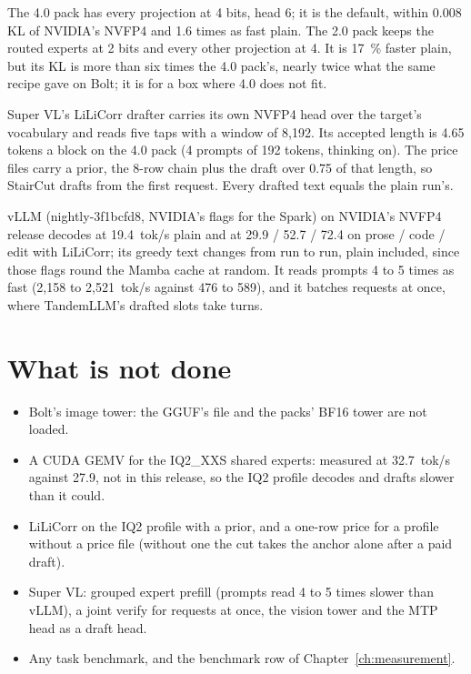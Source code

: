 The 4.0 pack has every projection at 4 bits, head 6; it is the default, within 0.008 KL of NVIDIA's NVFP4 and 1.6 times as fast plain. The 2.0 pack keeps the routed experts at 2 bits and every other projection at 4. It is 17~\% faster plain, but its KL is more than six times the 4.0 pack's, nearly twice what the same recipe gave on Bolt; it is for a box where 4.0 does not fit.

Super VL's LiLiCorr drafter carries its own NVFP4 head over the target's vocabulary and reads five taps with a window of 8,192. Its accepted length is 4.65 tokens a block on the 4.0 pack (4 prompts of 192 tokens, thinking on). The price files carry a  prior, the 8-row chain plus the draft over 0.75 of that length, so StairCut drafts from the first request. Every drafted text equals the plain run's.

vLLM (nightly-3f1bcfd8, NVIDIA's flags for the Spark) on NVIDIA's NVFP4 release decodes at 19.4~tok/s plain and at 29.9 / 52.7 / 72.4 on prose / code / edit with LiLiCorr; its greedy text changes from run to run, plain included, since those flags round the Mamba cache at random. It reads prompts 4 to 5 times as fast (2,158 to 2,521~tok/s against 476 to 589), and it batches requests at once, where TandemLLM's drafted slots take turns.

\section{What is not done}

\begin{itemize}
\item Bolt's image tower: the GGUF's  file and the packs' BF16 tower are not loaded.
\item A CUDA GEMV for the IQ2\_XXS shared experts: measured at 32.7~tok/s against 27.9, not in this release, so the IQ2 profile decodes and drafts slower than it could.
\item LiLiCorr on the IQ2 profile with a  prior, and a one-row price for a profile without a price file (without one the cut takes the anchor alone after a paid draft).
\item Super VL: grouped expert prefill (prompts read 4 to 5 times slower than vLLM), a joint verify for requests at once, the vision tower and the MTP head as a draft head.
\item Any task benchmark, and the benchmark row of Chapter~\ref{ch:measurement}.
\end{itemize}

